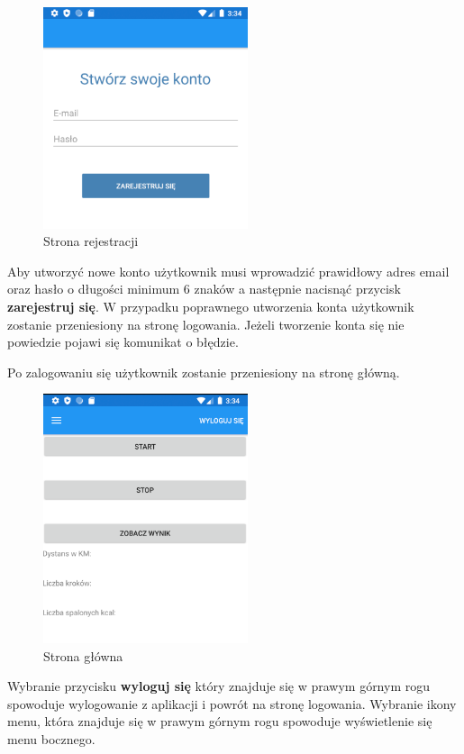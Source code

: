 \begin{figure}[!htb]
	\begin{center}
		\includegraphics[width=6cm]{rys/register.png}
		\caption{Strona rejestracji}
		\label{rys:rysunek030}
	\end{center}
\end{figure}

Aby utworzyć nowe konto użytkownik musi wprowadzić prawidłowy adres email oraz hasło o długości minimum 6 znaków a następnie nacisnąć przycisk \textbf{zarejestruj się}. W przypadku poprawnego utworzenia konta użytkownik zostanie przeniesiony na stronę logowania. Jeżeli tworzenie konta się nie powiedzie pojawi się komunikat o błędzie. 

Po zalogowaniu się użytkownik zostanie przeniesiony na stronę główną.

\begin{figure}[!htb]
	\begin{center}
		\includegraphics[width=6cm]{rys/glowna_empty.png}
		\caption{Strona główna}
		\label{rys:rysunek031}
	\end{center}
\end{figure}

Wybranie przycisku \textbf{wyloguj się} który znajduje się w prawym górnym rogu spowoduje wylogowanie z aplikacji i powrót na stronę logowania. Wybranie ikony menu, która znajduje się w prawym górnym rogu spowoduje wyświetlenie się menu bocznego.

